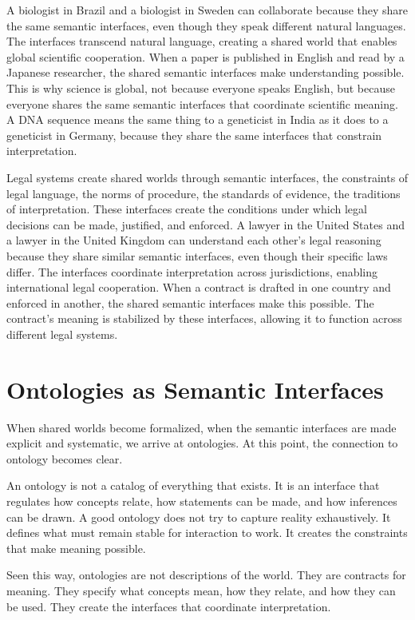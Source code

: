 \documentclass[
  openright]{book}
\begin{document}
A biologist in Brazil and a biologist in Sweden can collaborate because
they share the same semantic interfaces, even though they speak
different natural languages. The interfaces transcend natural language,
creating a shared world that enables global scientific cooperation. When
a paper is published in English and read by a Japanese researcher, the
shared semantic interfaces make understanding possible. This is why
science is global, not because everyone speaks English, but because
everyone shares the same semantic interfaces that coordinate scientific
meaning. A DNA sequence means the same thing to a geneticist in India as
it does to a geneticist in Germany, because they share the same
interfaces that constrain interpretation.

Legal systems create shared worlds through semantic interfaces, the
constraints of legal language, the norms of procedure, the standards of
evidence, the traditions of interpretation. These interfaces create the
conditions under which legal decisions can be made, justified, and
enforced. A lawyer in the United States and a lawyer in the United
Kingdom can understand each other's legal reasoning because they share
similar semantic interfaces, even though their specific laws differ. The
interfaces coordinate interpretation across jurisdictions, enabling
international legal cooperation. When a contract is drafted in one
country and enforced in another, the shared semantic interfaces make
this possible. The contract's meaning is stabilized by these interfaces,
allowing it to function across different legal systems.

\section{Ontologies as Semantic
Interfaces}\label{ontologies-as-semantic-interfaces}

When shared worlds become formalized, when the semantic interfaces are
made explicit and systematic, we arrive at ontologies. At this point,
the connection to ontology becomes clear.

An ontology is not a catalog of everything that exists. It is an
interface that regulates how concepts relate, how statements can be
made, and how inferences can be drawn. A good ontology does not try to
capture reality exhaustively. It defines what must remain stable for
interaction to work. It creates the constraints that make meaning
possible.

Seen this way, ontologies are not descriptions of the world. They are
contracts for meaning. They specify what concepts mean, how they relate,
and how they can be used. They create the interfaces that coordinate
interpretation.
\end{document}
